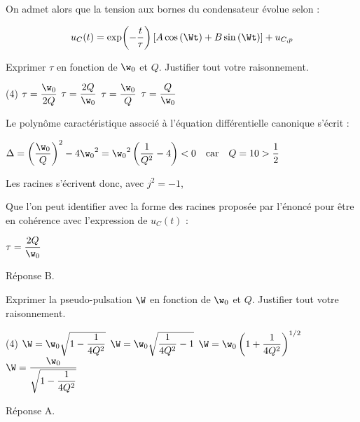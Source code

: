 \documentclass[a4paper, 12pt, final, garamond]{book}
\begin{document}
\enonce
{On admet alors que la tension aux bornes du condensateur évolue selon :

  \[
    u_C(t)=\exp(- \f{t}{\tau})\left[A\cos{\left(\Wt\right)+B\sin{\left(\Wt\right)}}\right]+u_{C,p}
  \]
}

\QR
{Exprimer $\tau$ en fonction de $\w_0$ et $Q$. Justifier tout votre raisonnement.

\begin{tasks}[label=\protect\fbox{\Alph*}, label-width=4ex](4)
	\task $\tau=\f{\w_0}{2Q}$
	\task $\tau=\f{2Q}{\w_0}$
	\task $\tau=\f{\w_0}{Q}$
	\task $\tau=\f{Q}{\w_0}$
\end{tasks}
}
{
Le polynôme caractéristique associé à l’équation différentielle canonique s’écrit :


 {$\Delta=\left(\f{\w_0}{Q}\right)^2-4{\w_0}^2={{\w}_0}^2\left(\f{1}{Q^2}-4\right)<0 \quad \text{car} \quad Q=10>\f{1}{2}$}

Les racines s’écrivent donc, avec  $j^2=-1$,


Que l’on peut identifier avec la forme des racines proposée par l’énoncé pour être en cohérence avec l’expression de $u_C\left(t\right)$ :


             {$\tau=\f{2Q}{\w_0}$}

\medskip

\noindent
Réponse B.
}

\QR
{Exprimer la pseudo-pulsation $\W$ en fonction de $\w_0$ et $Q$. Justifier tout votre raisonnement.

	\begin{tasks}[label=\protect\fbox{\Alph*}, label-width=4ex,
			item-indent=-1em, column-sep=8em](4)
		\task $\W=\w_0\sqrt{1-\f{1}{4Q^2}}$
		\task $\W=\w_0\sqrt{\f{1}{4Q^2 }-1}$
		\task $\W=\w_0\left(1+\f{1}{4Q^2}\right)^{1/2}$
		\task $\W=\f{\w_0}{\sqrt{1-\f{1}{4Q^2}}}$
	\end{tasks}
}
{

	\medskip

	\noindent
	Réponse A.
}
\end{document}
